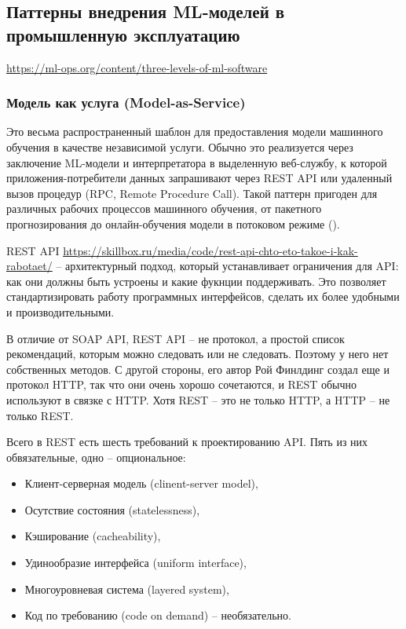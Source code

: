 \documentclass[%
	11pt,
	a4paper,
	utf8,
		]{article}
\begin{document}
\subsection{Паттерны внедрения ML-моделей в промышленную эксплуатацию}

\url{https://ml-ops.org/content/three-levels-of-ml-software}

\subsubsection{Модель как услуга (Model-as-Service)}

Это весьма распространенный шаблон для предоставления модели машинного обучения в качестве независимой услуги. Обычно это реализуется через заключение ML-модели и интерпретатора в выделенную веб-службу, к которой приложения-потребители данных запрашивают через REST API или удаленный вызов процедур (RPC, Remote Procedure Call). Такой паттерн пригоден для различных рабочих процессов машинного обучения, от пакетного прогнозирования до онлайн-обучения модели в потоковом режиме ().

REST API \url{https://skillbox.ru/media/code/rest-api-chto-eto-takoe-i-kak-rabotaet/} -- архитектурный подход, который устанавливает ограничения для API: как они должны быть устроены и какие фукнции поддерживать. Это позволяет стандартизировать работу программных интерфейсов, сделать их более удобными и производительными.

В отличие от SOAP API, REST API -- не протокол, а простой список рекомендаций, которым можно следовать или не следовать. Поэтому у него нет собственных методов. С другой стороны, его автор Рой Финлдинг создал еще и протокол HTTP, так что они очень хорошо сочетаются, и REST обычно используют в связке с HTTP. Хотя REST -- это не только HTTP, а HTTP -- не только REST.

Всего в REST есть шесть требований к проектированию API. Пять из них обвязательные, одно -- опциональное:
\begin{itemize}
	\item Клиент-серверная модель (clinent-server model),
	
	\item Осутствие состояния (statelessness),
	
	\item Кэширование (cacheability),
	
	\item Удинообразие интерфейса (uniform interface),
	
	\item Многоуровневая система (layered system),
	
	\item Код по требованию (code on demand) -- необязательно.
\end{itemize}
\end{document}
